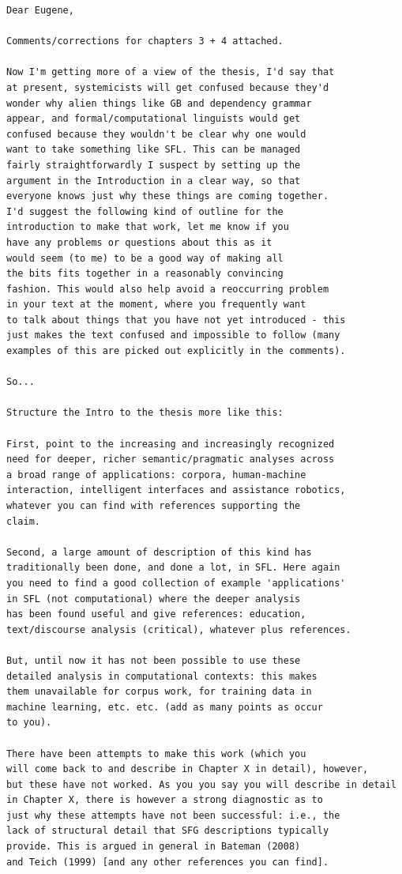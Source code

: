 \begin{Verbatim}
Dear Eugene,

Comments/corrections for chapters 3 + 4 attached.

Now I'm getting more of a view of the thesis, I'd say that
at present, systemicists will get confused because they'd
wonder why alien things like GB and dependency grammar
appear, and formal/computational linguists would get
confused because they wouldn't be clear why one would
want to take something like SFL. This can be managed
fairly straightforwardly I suspect by setting up the
argument in the Introduction in a clear way, so that
everyone knows just why these things are coming together.
I'd suggest the following kind of outline for the
introduction to make that work, let me know if you
have any problems or questions about this as it
would seem (to me) to be a good way of making all
the bits fits together in a reasonably convincing
fashion. This would also help avoid a reoccurring problem
in your text at the moment, where you frequently want
to talk about things that you have not yet introduced - this
just makes the text confused and impossible to follow (many
examples of this are picked out explicitly in the comments).

So...

Structure the Intro to the thesis more like this:

First, point to the increasing and increasingly recognized
need for deeper, richer semantic/pragmatic analyses across
a broad range of applications: corpora, human-machine
interaction, intelligent interfaces and assistance robotics,
whatever you can find with references supporting the
claim.

Second, a large amount of description of this kind has
traditionally been done, and done a lot, in SFL. Here again
you need to find a good collection of example 'applications'
in SFL (not computational) where the deeper analysis
has been found useful and give references: education,
text/discourse analysis (critical), whatever plus references.

But, until now it has not been possible to use these
detailed analysis in computational contexts: this makes
them unavailable for corpus work, for training data in
machine learning, etc. etc. (add as many points as occur
to you).

There have been attempts to make this work (which you
will come back to and describe in Chapter X in detail), however,
but these have not worked. As you you say you will describe in detail
in Chapter X, there is however a strong diagnostic as to
just why these attempts have not been successful: i.e., the
lack of structural detail that SFG descriptions typically
provide. This is argued in general in Bateman (2008)
and Teich (1999) [and any other references you can find].


\end{Verbatim}
